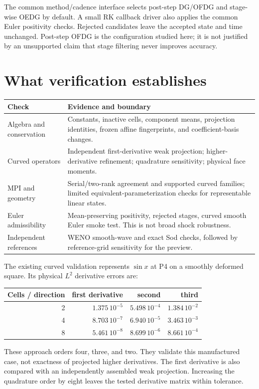 The common method/cadence interface selects post-step DG/OFDG and stage-wise
OEDG by default. A small RK callback driver also applies the common Euler
positivity checks. Rejected candidates leave the accepted state and time
unchanged. Post-step OFDG is the configuration studied here; it is not justified
by an unsupported claim that stage filtering never improves accuracy.

\section{What verification establishes}
\begin{center}
\begin{tabular}{@{}p{}p{}@{}}
\toprule
Check & Evidence and boundary\\\midrule
Algebra and conservation & Constants, inactive cells, component means, projection
identities, frozen affine fingerprints, and coefficient-basis changes.\\
Curved operators & Independent first-derivative weak projection; higher-derivative
refinement; quadrature sensitivity; physical face moments.\\
MPI and geometry & Serial/two-rank agreement and supported curved families;
limited equivalent-parameterization checks for representable linear states.\\
Euler admissibility & Mean-preserving positivity, rejected stages, curved smooth
Euler smoke test. This is not broad shock robustness.\\
Independent references & WENO smooth-wave and exact Sod checks, followed by
reference-grid sensitivity for the preview.\\\bottomrule
\end{tabular}
\end{center}

The existing curved validation represents $\sin x$ at P4 on a smoothly deformed
square. Its physical $L^2$ derivative errors are:
\begin{center}
\begin{tabular}{rrrr}
\toprule
Cells / direction & first derivative & second & third\\\midrule
2 & $1.375\,10^{-5}$ & $5.498\,10^{-4}$ & $1.384\,10^{-2}$\\
4 & $8.703\,10^{-7}$ & $6.940\,10^{-5}$ & $3.463\,10^{-3}$\\
8 & $5.461\,10^{-8}$ & $8.699\,10^{-6}$ & $8.661\,10^{-4}$\\\bottomrule
\end{tabular}
\end{center}
These approach orders four, three, and two. They validate this manufactured
case, not exactness of projected higher derivatives. The first derivative is
also compared with an independently assembled weak projection. Increasing the
quadrature order by eight leaves the tested derivative matrix within tolerance.

